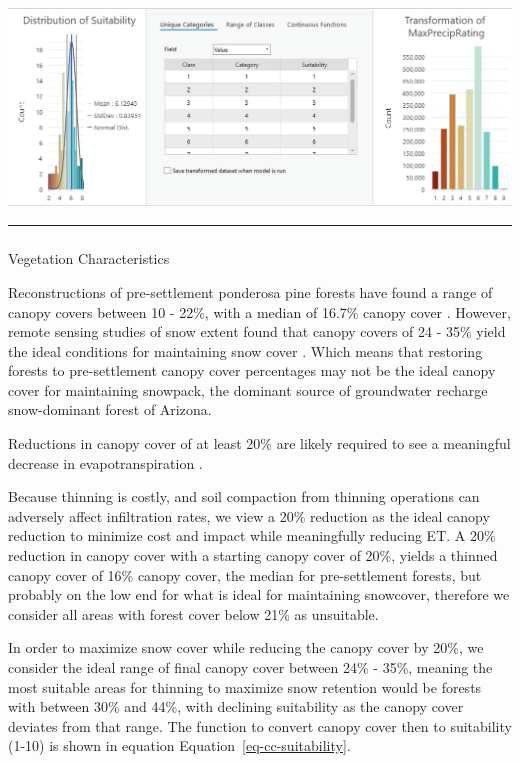 \documentclass[
  number]{elsarticle}
\makeatletter
\let\oldsubparagraph\subparagraph
\renewcommand{\subparagraph}{
    \@ifstar
      \xxxSubParagraphStar
      \xxxSubParagraphNoStar
  }
\newcommand{\xxxSubParagraphStar}[1]{\oldsubparagraph*{#1}\mbox{}}
\newcommand{\xxxSubParagraphNoStar}[1]{\oldsubparagraph{#1}\mbox{}}
\makeatother
\begin{document}
\includegraphics{images/Precipitation_suitability.PNG}

\begin{center}\rule{0.5\linewidth}{0.5pt}\end{center}

\subparagraph{Vegetation
Characteristics}\label{vegetation-characteristics}

Reconstructions of pre-settlement ponderosa pine forests have found a
range of canopy covers between 10 - 22\%, with a median of 16.7\% canopy
cover \citep{huffman2012}. However, remote sensing studies of snow
extent found that canopy covers of 24 - 35\% yield the ideal conditions
for maintaining snow cover \citep{sankey2015, belmonte2021a}. Which
means that restoring forests to pre-settlement canopy cover percentages
may not be the ideal canopy cover for maintaining snowpack, the dominant
source of groundwater recharge snow-dominant forest of Arizona.

Reductions in canopy cover of at least 20\% are likely required to see a
meaningful decrease in evapotranspiration \citep{adams2012}.

Because thinning is costly, and soil compaction from thinning operations
can adversely affect infiltration rates, we view a 20\% reduction as the
ideal canopy reduction to minimize cost and impact while meaningfully
reducing ET. A 20\% reduction in canopy cover with a starting canopy
cover of 20\%, yields a thinned canopy cover of 16\% canopy cover, the
median for pre-settlement forests, but probably on the low end for what
is ideal for maintaining snowcover, therefore we consider all areas with
forest cover below 21\% as unsuitable.

In order to maximize snow cover while reducing the canopy cover by 20\%,
we consider the ideal range of final canopy cover between 24\% - 35\%,
meaning the most suitable areas for thinning to maximize snow retention
would be forests with between 30\% and 44\%, with declining suitability
as the canopy cover deviates from that range. The function to convert
canopy cover then to suitability (1-10) is shown in equation
Equation~\ref{eq-cc-suitability}.
\end{document}
